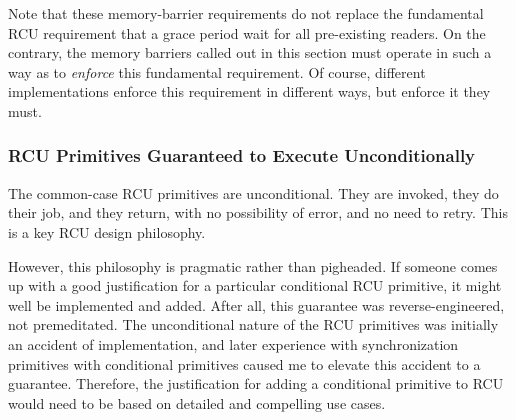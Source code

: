 \QuickQuizEnd

Note that these memory-barrier requirements do not replace the
fundamental RCU requirement that a grace period wait for all
pre-existing readers.
On the contrary, the memory barriers called out in
this section must operate in such a way as to \emph{enforce} this fundamental
requirement. Of course, different implementations enforce this
requirement in different ways, but enforce it they must.


\subsubsection{RCU Primitives Guaranteed to Execute Unconditionally}

The common-case RCU primitives are unconditional.
They are invoked, they
do their job, and they return, with no possibility of error, and no need
to retry.
This is a key RCU design philosophy.

However, this philosophy is pragmatic rather than pigheaded.
If someone
comes up with a good justification for a particular conditional RCU
primitive, it might well be implemented and added. After all, this
guarantee was reverse-engineered, not premeditated.
The unconditional
nature of the RCU primitives was initially an accident of
implementation, and later experience with synchronization primitives
with conditional primitives caused me to elevate this accident to a
guarantee.
Therefore, the justification for adding a conditional
primitive to RCU would need to be based on detailed and compelling use
cases.


